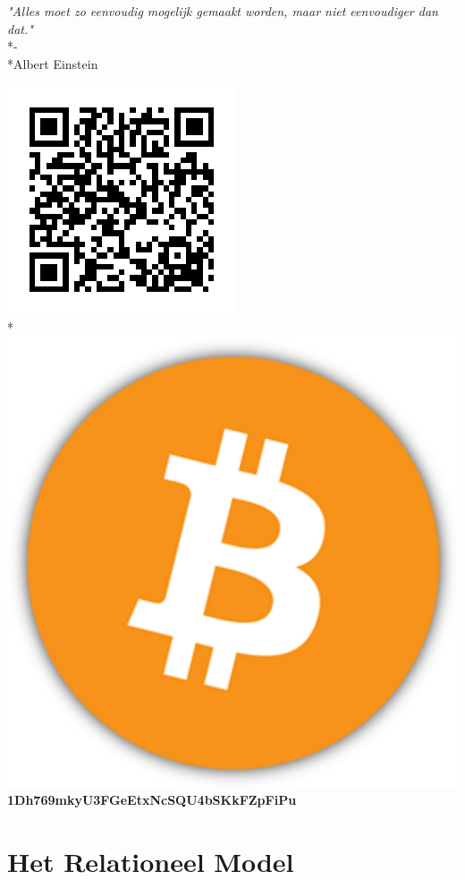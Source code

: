 \documentclass[10pt]{article}
\begin{document}
\begin{center}
\textit{"Alles moet zo eenvoudig mogelijk gemaakt worden, maar niet eenvoudiger dan dat."}\\*-\\*Albert Einstein
\end{center}
\begin{center}
\includegraphics[scale=0.5]{BitcoinAddress.png}\\*
\includegraphics[scale=0.02]{Bitcoin.png} \textbf{1Dh769mkyU3FGeEtxNcSQU4bSKkFZpFiPu}
\end{center}
\clearpage
\section{Het Relationeel Model}
\end{document}
